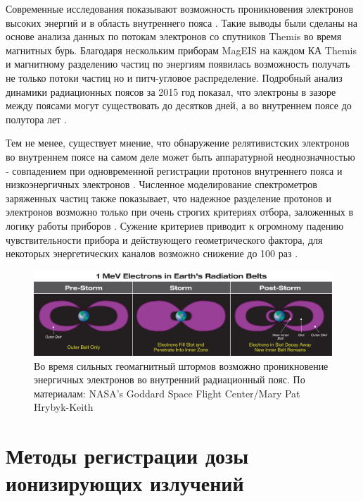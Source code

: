 Современные исследования показывают возможность проникновения электронов высоких энергий и в область внутреннего пояса \cite{Claudepierre2017}. Такие выводы были сделаны на основе анализа данных по потокам электронов со спутников Themis во время магнитных бурь. Благодаря нескольким приборам MagEIS  на каждом КА Themis и магнитному разделению частиц по энергиям появилась возможность получать не только потоки частиц но и питч-угловое распределение. Подробный анализ динамики радиационных поясов за 2015 год показал, что электроны в зазоре между поясами могут существовать до десятков дней, а во внутреннем поясе до полутора лет \cite{Claudepierre2017}. 

Тем не менее, существует мнение, что обнаружение релятивистских электронов во внутреннем поясе на самом деле может быть аппаратурной неоднозначностью - совпадением при одновременной регистрации протонов внутреннего пояса и низкоэнергичных электронов \cite{Selesnick2015}. Численное моделирование спектрометров заряженных частиц также показывает, что надежное разделение протонов и электронов возможно только при очень строгих критериях отбора, заложенных в логику работы приборов \cite{zolotarev2017numerical51590279}. Сужение критериев приводит к огромному падению чувствительности прибора и действующего геометрического фактора, для некоторых энергетических каналов возможно снижение до 100 раз \cite{zolotarev2017numerical51590279}.
 
\begin{figure}
	\centering
	\includegraphics[width=0.7\linewidth]{images/inner_electron_belt_illustration}
	\caption[Образование долгоживущего внутреннего электронного пояса]{ Во время сильных геомагнитный штормов возможно проникновение энергичных электронов во внутренний радиационный пояс. По материалам: NASA’s Goddard Space Flight Center/Mary Pat Hrybyk-Keith \cite{Johnson-Groh2017}}
	\label{fig:innerelectronbeltillustration}
\end{figure}

\section{Методы регистрации дозы ионизирующих излучений} \label{sect1_2}

